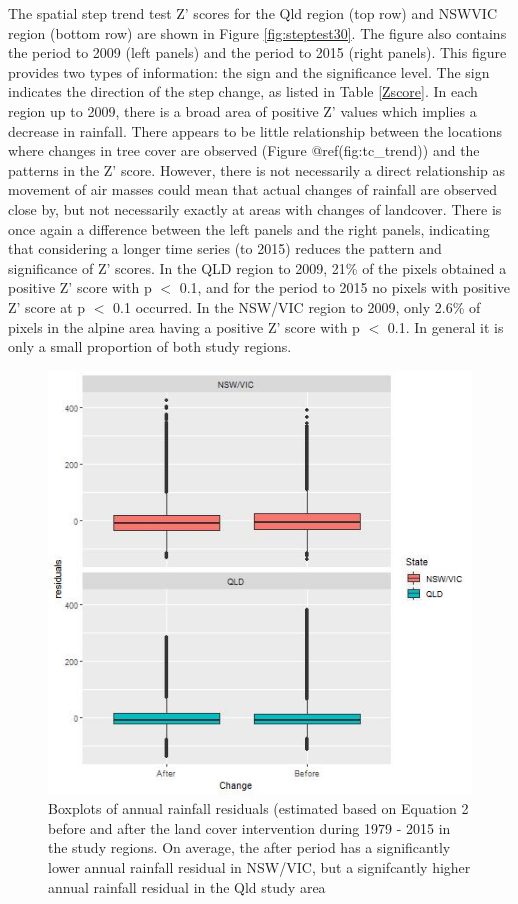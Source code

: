 \documentclass[]{elsarticle} %
\theoremstyle{definition}
\theoremstyle{definition}
\theoremstyle{definition}
\theoremstyle{remark}
\begin{document}
The spatial step trend test Z' scores for the Qld region (top row) and
NSWVIC region (bottom row) are shown in Figure \ref{fig:steptest30}. The
figure also contains the period to 2009 (left panels) and the period to
2015 (right panels). This figure provides two types of information: the
sign and the significance level. The sign indicates the direction of the
step change, as listed in Table \ref{Zscore}. In each region up to 2009,
there is a broad area of positive Z' values which implies a decrease in
rainfall. There appears to be little relationship between the locations
where changes in tree cover are observed (Figure @ref(fig:tc\_trend))
and the patterns in the Z' score. However, there is not necessarily a
direct relationship as movement of air masses could mean that actual
changes of rainfall are observed close by, but not necessarily exactly
at areas with changes of landcover. There is once again a difference
between the left panels and the right panels, indicating that
considering a longer time series (to 2015) reduces the pattern and
significance of Z' scores. In the QLD region to 2009, 21\% of the pixels
obtained a positive Z' score with p \(<\) 0.1, and for the period to
2015 no pixels with positive Z' score at p \(<\) 0.1 occurred. In the
NSW/VIC region to 2009, only 2.6\% of pixels in the alpine area having a
positive Z' score with p \(<\) 0.1. In general it is only a small
proportion of both study regions.

\begin{figure}
\includegraphics[width=0.9\linewidth]{figures/ResidualBoxplotchange} \caption{Boxplots of annual rainfall residuals (estimated based on Equation 2 before and after the land cover intervention during 1979 - 2015 in the study regions. On average, the after period has a significantly lower annual rainfall residual in NSW/VIC, but a signifcantly higher annual rainfall residual in the Qld study area}\label{fig:meandiff}
\end{figure}
\end{document}
